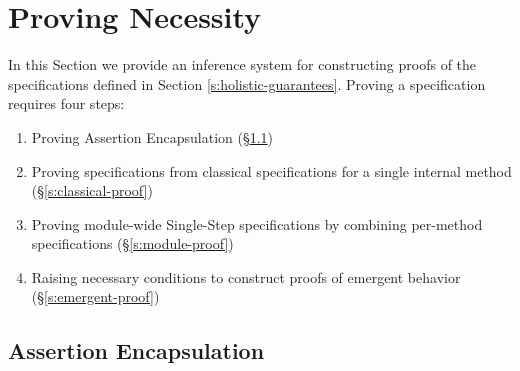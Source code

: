 \section{Proving Necessity}
\label{s:inference}

In this Section we provide an inference system for constructing 
proofs of the \Nec specifications defined in Section \ref{s:holistic-guarantees}.
Proving a specification requires four steps:
\begin{enumerate} 
\item
Proving Assertion Encapsulation (\S \ref{s:encaps-proof})
\item
Proving \Nec specifications from classical specifications for a single internal method (\S \ref{s:classical-proof})
\item
Proving module-wide Single-Step \Nec specifications by combining per-method \Nec specifications (\S \ref{s:module-proof})
\item
Raising necessary conditions to construct proofs of emergent behavior (\S \ref{s:emergent-proof})
\end{enumerate}

\subsection {Assertion Encapsulation}
\label{s:encaps-proof}

